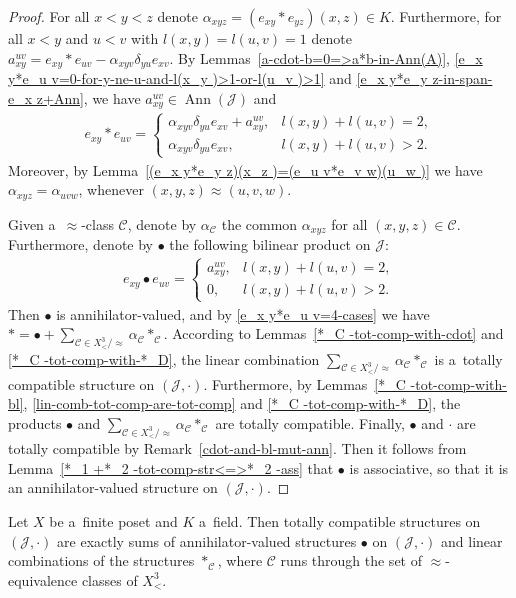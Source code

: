 \documentclass{jonasart}
\newcommand{\af}{\alpha}
\newcommand{\bl}{\bullet}
\newcommand{\C}{\mathcal{C}}
\newcommand{\dl}{\delta}
\newcommand{\J}{\mathcal{J}}
\DeclareMathOperator{\Ann}{Ann}
\begin{document}
	\begin{proof}
		For all $x<y<z$ denote $\af_{xyz}=(e_{xy}*e_{yz})(x,z)\in K$. Furthermore, for all $x<y$ and $u<v$ with $l(x,y)=l(u,v)=1$ denote $a_{xy}^{uv}=e_{xy}*e_{uv}-\af_{xyv}\dl_{yu}e_{xv}$. By Lemmas~\ref{a-cdot-b=0=>a*b-in-Ann(A)}, \ref{e_x y*e_u v=0-for-y-ne-u-and-l(x_y )>1-or-l(u_v )>1} and \ref{e_x y*e_y z-in-span-e_x z+Ann}, we have $a_{xy}^{uv}\in \Ann(\J)$ and
		\begin{align}\label{e_x y*e_u v=4-cases}
			e_{xy}*e_{uv}=
			\begin{cases}
				\af_{xyv}\dl_{yu}e_{xv}+a_{xy}^{uv}, & l(x,y)+l(u,v)=2,\\
				\af_{xyv}\dl_{yu}e_{xv}, & l(x,y)+l(u,v)>2.
			\end{cases}
		\end{align}
		Moreover, by Lemma~\ref{(e_x y*e_y z)(x_z )=(e_u v*e_v w)(u_w )} we have $\af_{xyz}=\af_{uvw}$, whenever $(x,y,z)\approx(u,v,w)$.

		Given a~$\approx$-class $\C$, denote by $\af_\C$ the common $\af_{xyz}$ for all $(x,y,z)\in\C$. Furthermore, denote by $\bl$ the following bilinear product on $\J$:
		\begin{align*}
			e_{xy}\bl e_{uv}=
			\begin{cases}
				a_{xy}^{uv}, & l(x,y)+l(u,v)=2,\\
				0, & l(x,y)+l(u,v)>2.
			\end{cases}
		\end{align*}
		Then $\bl$ is annihilator-valued, and by \eqref{e_x y*e_u v=4-cases} we have $*=\bl+\sum_{\C\in X^3_< /{\approx}}\af_\C *_\C$. According to Lemmas~\ref{*_C -tot-comp-with-cdot} and \ref{*_C -tot-comp-with-*_D}, the linear combination $\sum_{\C\in X^3_< /{\approx}} \af_\C *_\C$ is a~totally compatible structure on $(\J,\cdot)$. Furthermore, by Lemmas~\ref{*_C -tot-comp-with-bl}, \ref{lin-comb-tot-comp-are-tot-comp} and \ref{*_C -tot-comp-with-*_D}, the products $\bl$ and $\sum_{\C\in X^3_< /{\approx}} \af_\C *_\C$ are totally compatible. Finally, $\bl$ and $\cdot$ are totally compatible by Remark~\ref{cdot-and-bl-mut-ann}. Then it follows from Lemma~\ref{*_1 +*_2 -tot-comp-str<=>*_2 -ass} that $\bl$ is associative, so that it is an annihilator-valued structure on $(\J,\cdot)$.
	\end{proof}

	\begin{theorem}\label{tot-comp-exactly-bl+lin-comb-*_C}
		Let $X$ be a~finite poset and $K$ a~field. Then totally compatible structures on $(\J,\cdot)$ are exactly sums of annihilator-valued structures $\bl$ on $(\J,\cdot)$ and linear combinations of the structures $*_\C$, where $\C$ runs through the set of $\approx$-equivalence classes of $X^3_<$.
	\end{theorem}
\end{document}
